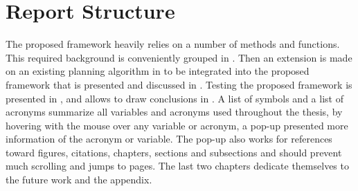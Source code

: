 \section{Report Structure}%
\label{sec:report_structure}
The proposed framework heavily relies on a number of methods and functions. This required background is conveniently grouped in . Then an extension is made on an existing planning algorithm in  to be integrated into the proposed framework that is presented and discussed in . Testing the proposed framework is presented in , and allows to draw conclusions in . A list of symbols and a list of acronyms summarize all variables and acronyms used throughout the thesis, by hovering with the mouse over any variable or acronym, a pop-up presented more information of the acronym or variable. The pop-up also works for references toward figures, citations, chapters, sections and subsections and should prevent much scrolling and jumps to pages. The last two chapters dedicate themselves to the future work and the appendix.\bs

